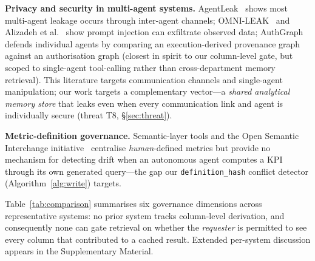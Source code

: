 \documentclass[nolineno]{ieeeaccess}
\begin{document}
\textbf{Privacy and security in multi-agent systems.}
AgentLeak~\cite{elyagoubi2026agentleak} shows most multi-agent leakage
occurs through inter-agent channels; OMNI-LEAK~\cite{naik2026omnileak} and
Alizadeh et al.~\cite{alizadeh2025leak} show prompt injection can exfiltrate
observed data; AuthGraph~\cite{wang2026authgraph} defends individual agents
by comparing an execution-derived provenance graph against an authorisation
graph (closest in spirit to our column-level gate, but scoped to
single-agent tool-calling rather than cross-department memory retrieval).
This literature targets communication channels and single-agent
manipulation; our work targets a complementary vector---a \emph{shared
analytical memory store} that leaks even when every communication link and
agent is individually secure (threat T8, \S\ref{sec:threat}).

\textbf{Metric-definition governance.}
Semantic-layer tools and the Open Semantic Interchange
initiative~\cite{snowflake2025osi} centralise \emph{human}-defined metrics
but provide no mechanism for detecting drift when an autonomous agent
computes a KPI through its own generated query---the gap our
\texttt{definition\_hash} conflict detector (Algorithm~\ref{alg:write})
targets.

Table~\ref{tab:comparison} summarises six governance dimensions across
representative systems: no prior system tracks column-level derivation, and
consequently none can gate retrieval on whether the \emph{requester} is
permitted to see every column that contributed to a cached result.
Extended per-system discussion appears in the Supplementary Material.
\end{document}
